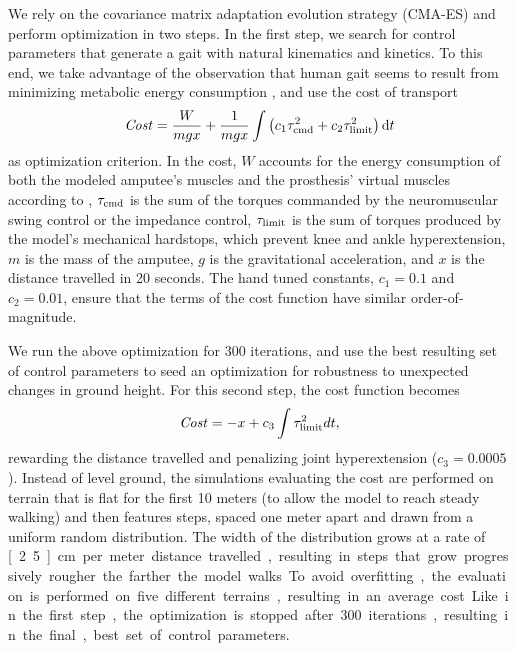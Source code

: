 We rely on the covariance matrix adaptation evolution strategy (CMA-ES)
\citep{hansen2006cma} and perform optimization in two steps. In the first step,
we search for control parameters that generate a gait with natural kinematics
and kinetics. To this end, we take advantage of the observation that human gait
seems to result from minimizing metabolic energy consumption
\citep{mcneill2002energetics}, and use the cost of transport 
\begin{align}
    \mathit{Cost} = \frac{W}{mgx} + \frac{1}{mgx} \int \left( 
        c_1\tau_{\mathrm{cmd}}^2  + c_2 \tau_{\mathrm{limit}}^2 \right) \mathrm{d}t
    \label{eq:costfuncenergy}
\end{align}
as optimization criterion. In the cost, $W$ accounts for the energy consumption
of both the modeled amputee's muscles and the prosthesis' virtual muscles
according to \citet{umberger2003model}, $\tau_{\mathrm{cmd}}$ is the sum of the
torques commanded by the neuromuscular swing control or the impedance control,
$\tau_{\mathrm{limit}}$ is the sum of torques produced by the model's mechanical
hardstops, which prevent knee and ankle hyperextension, $m$ is the mass of the
amputee, $g$ is the gravitational acceleration, and $x$ is the distance
travelled in 20 seconds. The hand tuned constants, $c_1 = 0.1$ and $c_2 = 0.01$,
ensure that the terms of the cost function have similar order-of-magnitude. 

We run the above optimization for 300 iterations, and use the best resulting set
of control parameters to seed an optimization for robustness to unexpected
changes in ground height. For this second step, the cost function becomes
\begin{align}
    \mathit{Cost} = -x + c_3 \int \tau_{\mathrm{limit}}^2 dt ,
\end{align}
rewarding the distance travelled and penalizing joint hyperextension ($c_3 =
0.0005$). Instead of level ground, the simulations evaluating the cost are
performed on terrain that is flat for the first 10 meters (to allow the model to
reach steady walking) and then features steps, spaced one meter apart and drawn
from a uniform random distribution. The width of the distribution grows at a
rate of \unit[2.5]{cm} per meter distance travelled, resulting in steps that
grow progressively rougher the farther the model walks. To avoid overfitting,
the evaluation is performed on five different terrains, resulting in an average
cost. Like in the first step, the optimization is stopped after 300 iterations,
resulting in the final, best set of control parameters.

